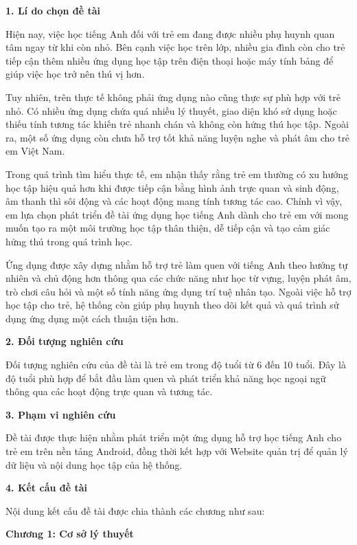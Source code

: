 \noindent\textbf{1. Lí do chọn đề tài}


Hiện nay, việc học tiếng Anh đối với trẻ em đang được nhiều phụ huynh quan tâm ngay từ khi còn nhỏ. Bên cạnh việc học trên lớp, nhiều gia đình còn cho trẻ tiếp cận thêm nhiều ứng dụng học tập trên điện thoại hoặc máy tính bảng để giúp việc học trở nên thú vị hơn.


Tuy nhiên, trên thực tế không phải ứng dụng nào cũng thực sự phù hợp với trẻ nhỏ. Có nhiều ứng dụng chứa quá nhiều lý thuyết, giao diện khó sử dụng hoặc thiếu tính tương tác khiến trẻ nhanh chán và không còn hứng thú học tập. Ngoài ra, một số ứng dụng còn chưa hỗ trợ tốt khả năng luyện nghe và phát âm cho trẻ em Việt Nam.


Trong quá trình tìm hiểu thực tế, em nhận thấy rằng trẻ em thường có xu hướng học tập hiệu quả hơn khi được tiếp cận bằng hình ảnh trực quan và sinh động, âm thanh thì sôi động và các hoạt động mang tính tương tác cao. Chính vì vậy, em lựa chọn phát triển đề tài ứng dụng học tiếng Anh dành cho trẻ em với mong muốn tạo ra một môi trường học tập thân thiện, dễ tiếp cận và tạo cảm giác hứng thú trong quá trình học.


Ứng dụng được xây dựng nhằm hỗ trợ trẻ làm quen với tiếng Anh theo hướng tự nhiên và chủ động hơn thông qua các chức năng như học từ vựng, luyện phát âm, trò chơi câu hỏi và một số tính năng ứng dụng trí tuệ nhân tạo. Ngoài việc hỗ trợ học tập cho trẻ, hệ thống còn giúp phụ huynh theo dõi kết quả và quá trình sử dụng ứng dụng một cách thuận tiện hơn.


\noindent\textbf{2. Đối tượng nghiên cứu}


Đối tượng nghiên cứu của đề tài là trẻ em trong độ tuổi từ 6 đến 10 tuổi. Đây là độ tuổi phù hợp để bắt đầu làm quen và phát triển khả năng học ngoại ngữ thông qua các hoạt động trực quan và tương tác.


\noindent\textbf{3. Phạm vi nghiên cứu}


Đề tài được thực hiện nhằm phát triển một ứng dụng hỗ trợ học tiếng Anh cho trẻ em trên nền tảng Android, đồng thời kết hợp với Website quản trị để quản lý dữ liệu và nội dung học tập của hệ thống.


\noindent\textbf{4. Kết cấu đề tài}


Nội dung kết cấu đề tài được chia thành các chương như sau:

\vspace{0.3cm}

\noindent\textbf{Chương 1: Cơ sở lý thuyết}

